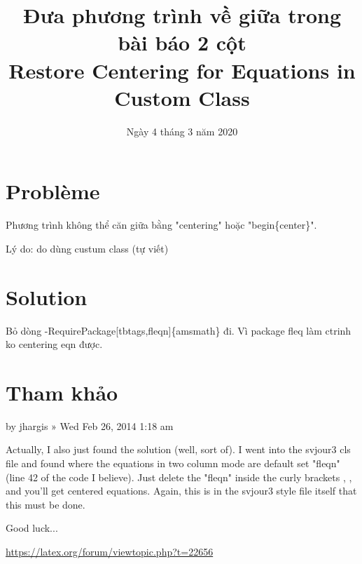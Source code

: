 \documentclass[12pt]{article}
\title{Đưa phương trình về giữa trong bài báo 2 cột \\
	Restore Centering for Equations in Custom Class}
\date{Ngày 4 tháng 3 năm 2020}
\begin{document}
	
	\maketitle
	
	\section{Problème}
	Phương trình không thể căn giữa bằng "centering" hoặc "begin\{center\}".
	
	Lý do: do dùng custum class (tự viết)
	
	\section{Solution}
	Bỏ dòng -RequirePackage[tbtags,fleqn]\{amsmath\} đi. Vì package fleq làm ctrinh ko centering eqn được.
	
	\section{Tham khảo}
	
	by jhargis » Wed Feb 26, 2014 1:18 am
	
	Actually, I also just found the solution (well, sort of). I went into the svjour3 cls file and found where the equations in two column mode are default set "fleqn" (line 42 of the code I believe). Just delete the "fleqn" inside the curly brackets , {}, and you'll get centered equations. Again, this is in the svjour3 style file itself that this must be done.
	
	Good luck...
	
	\url{https://latex.org/forum/viewtopic.php?t=22656}
	
\end{document}
